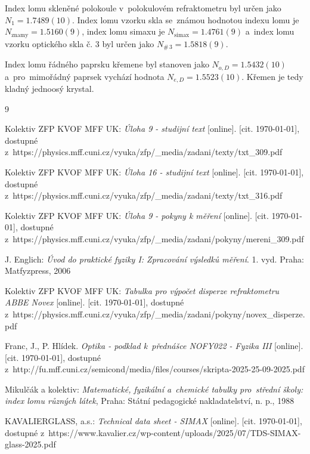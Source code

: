 \documentclass{../concepts/titul_protokol_p/prepareprotokol} %
\begin{document}
Index lomu skleněné polokoule v~polokulovém refraktometru byl určen jako $N_1 = 1.7489(10)$. Index lomu
vzorku skla se~známou hodnotou indexu lomu je $N_\mathrm{znamy} = 1.5160(9)$, index lomu simaxu je 
$N_\mathrm{simax} = 1.4761(9)$ a~index lomu vzorku optického skla č. 3 byl určen jako $N_\mathrm{\# \,3} = 1.5818(9)$.


Index lomu řádného paprsku křemene byl stanoven jako $N_{o,D} = 1.5432(10)$ a~pro~mimořádný paprsek vychází
hodnota $N_{e,D} = 1.5523(10)$. Křemen je tedy kladný jednoosý krystal.


\begin{thebibliography}{9}

 Kolektiv ZFP KVOF MFF UK: \textit{Úloha 9 - studijní text} [online]. 
[cit. \today], dostupné z~https://physics.mff.cuni.cz/vyuka/zfp/\_media/zadani/texty/txt\_309.pdf

 Kolektiv ZFP KVOF MFF UK: \textit{Úloha 16 - studijní text} 
[online]. [cit. \today], dostupné
z~https://physics.mff.cuni.cz/vyuka/zfp/\_media/zadani/texty/txt\_316.pdf

 Kolektiv ZFP KVOF MFF UK: \textit{Úloha 9 - pokyny k měření} [online]. [cit. \today], dostupné
z~https://physics.mff.cuni.cz/vyuka/zfp/\_media/zadani/pokyny/mereni\_309.pdf

 J. Englich: \textit{Úvod do praktické fyziky I: Zpracování výsledků měření}. 
1. vyd. Praha: Matfyzpress, 2006

 Kolektiv ZFP KVOF MFF UK: \textit{Tabulka pro výpočet disperze refraktometru ABBE Novex}
[online]. [cit. \today], dostupné
z~https://physics.mff.cuni.cz/vyuka/zfp/\_media/zadani/pokyny/novex\_disperze.pdf

 Franc, J., P. Hlídek. \textit{Optika - podklad k~přednášce NOFY022 - Fyzika III}
[online]. [cit. \today], dostupné
z~http://fu.mff.cuni.cz/semicond/media/files/courses/skripta-2025-25-09-2025.pdf

 Mikulčák a kolektiv: \textit{Matematické, fyzikální a~chemické tabulky pro~střední 
školy: index lomu různých látek}, Praha: Státní pedagogické nakladatelství, n. p., 1988

 KAVALIERGLASS, a.s.: \textit{Technical data sheet - SIMAX} [online]. [cit. \today],
dostupné z~https://www.kavalier.cz/wp-content/uploads/2025/07/TDS-SIMAX-glass-2025.pdf

\end{thebibliography}
\end{document}
